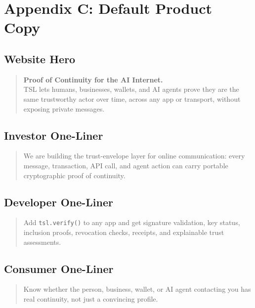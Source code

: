 \documentclass[11pt]{article}
\begin{document}
\section{Appendix C: Default Product Copy}

\subsection{Website Hero}

\begin{quote}
\textbf{Proof of Continuity for the AI Internet.}\\
TSL lets humans, businesses, wallets, and AI agents prove they are the same trustworthy actor over time, across any app or transport, without exposing private messages.
\end{quote}

\subsection{Investor One-Liner}

\begin{quote}
We are building the trust-envelope layer for online communication: every message, transaction, API call, and agent action can carry portable cryptographic proof of continuity.
\end{quote}

\subsection{Developer One-Liner}

\begin{quote}
Add \texttt{tsl.verify()} to any app and get signature validation, key status, inclusion proofs, revocation checks, receipts, and explainable trust assessments.
\end{quote}

\subsection{Consumer One-Liner}

\begin{quote}
Know whether the person, business, wallet, or AI agent contacting you has real continuity, not just a convincing profile.
\end{quote}
\end{document}
